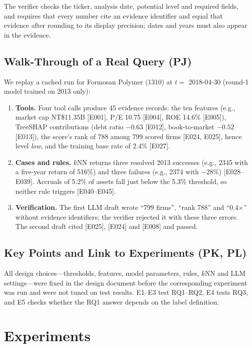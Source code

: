 \documentclass[conference]{IEEEtran}
\begin{document}
The verifier checks the ticker, analysis date, potential level and required fields, and requires that every number cite an evidence identifier and equal that evidence after rounding to its display precision; dates and years must also appear in the evidence.

\subsection{Walk-Through of a Real Query (PJ)}
We replay a cached run for Formosan Polymer (1310) at $t=$ 2018-04-30 (round-1 model trained on 2013 only):
\begin{enumerate}
\item \textbf{Tools.} Four tool calls produce 45 evidence records: the ten features (e.g., market cap NT\$11.35B [E001], P/E 10.75 [E004], ROE 14.6\% [E005]), TreeSHAP contributions (debt ratio $-0.63$ [E012], book-to-market $-0.52$ [E013]), the score's rank of 788 among 799 scored firms [E024, E025], hence level \emph{low}, and the training base rate of 2.4\% [E027].
\item \textbf{Cases and rules.} $k$NN returns three resolved 2013 successes (e.g., 2345 with a five-year return of 516\%) and three failures (e.g., 2374 with $-28\%$) [E028--E039]. Accruals of 5.2\% of assets fall just below the 5.3\% threshold, so neither rule triggers [E040--E045].
\item \textbf{Verification.} The first LLM draft wrote ``799 firms'', ``rank 788'' and ``0.4$\times$'' without evidence identifiers; the verifier rejected it with these three errors. The second draft cited [E025], [E024] and [E008] and passed.
\end{enumerate}

\subsection{Key Points and Link to Experiments (PK, PL)}
All design choices---thresholds, features, model parameters, rules, $k$NN and LLM settings---were fixed in the design document before the corresponding experiment was run and were not tuned on test results. E1--E3 test RQ1--RQ2, E4 tests RQ3, and E5 checks whether the RQ1 answer depends on the label definition.

\section{Experiments}
\label{sec:exp}
\end{document}
